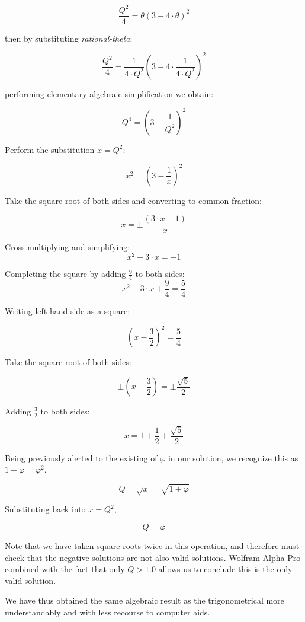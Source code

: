 \documentclass[11pt]{article}
\begin{document}
\[  \frac{Q^2}{4} = \theta (3 - 4 \cdot \theta)^2  \]

then by substituting \textit{rational-theta}:

\[  \frac{Q^2}{4} = \frac{1}{4 \cdot Q^2} (3 - 4 \cdot \frac{1}{4 \cdot Q^2})^2  \]

performing elementary algebraic simplification we obtain:

\[  Q^4 = (3 - \frac{1}{Q^2})^2   \]

Perform the substitution $x = Q^2$:

\[  x^2 = (3 - \frac{1}{x})^2   \]

Take the square root of both sides and converting to common fraction:

\[  x = \pm \frac{(3\cdot x - 1)}{x}   \]

Cross multiplying and simplifying:
\[  x^2 - 3\cdot x =  - 1   \]

Completing the square by adding $\frac{9}{4}$ to both sides:
\[  x^2 - 3\cdot x + \frac{9}{4} =  \frac{5}{4}   \]

Writing left hand side as a square:

\[  (x- \frac{3}{2})^2 =  \frac{5}{4}   \]

Take the square root of both sides:

\[  \pm (x- \frac{3}{2}) =  \pm \frac{\sqrt{5}}{2}   \]

Adding $\frac{3}{2}$ to both sides:

\[  x =   1 + \frac{1}{2} + \frac{\sqrt{5}}{2}   \]

Being previously alerted to the existing of $\varphi$ in our solution, we recognize
this as $1 + \varphi = \varphi^2$.

\[  Q = \sqrt{x}  =   \sqrt{1 + \varphi}  \]

Substituting back into $x = Q ^ 2$,

\[  Q =   \varphi  \]

Note that we have taken square roots twice in this operation, and therefore must
check that the negative solutions are not also valid solutions. Wolfram Alpha Pro
combined with the fact that only $Q > 1.0$ allows us to conclude this is the
only valid solution.

We have thus obtained the same algebraic result as the trigonometrical more understandably
and with less recourse to computer aids.
\end{document}
